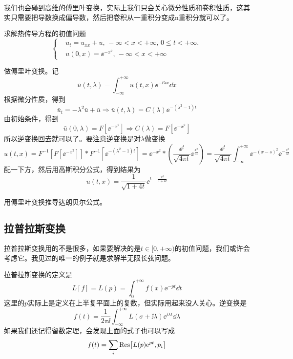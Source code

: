 我们也会碰到高维的傅里叶变换，实际上我们只会关心微分性质和卷积性质，这其实只需要把导数换成偏导数，然后把卷积从一重积分变成n重积分就可以了。
\begin{problembox}
    \begin{example}
        求解热传导方程的初值问题
        \begin{equation*}
            \left\{
                \begin{aligned}
                    &u_t = u_{xx} + u,\, -\infty < x < +\infty,\, 0 \leq t < +\infty,\\
                    &u(0, x) = \ee^{-x^2},\, -\infty < x < +\infty
                \end{aligned}
            \right.
        \end{equation*}
    \end{example}
    \begin{solution}
        做傅里叶变换。记
        \[\bar{u}(t, \lambda) = \int_{-\infty}^{+\infty} u(t, x) \ee^{- \ii \lambda x} \dd{x}\]
        根据微分性质，得到
        \[\bar{u}_t = -\lambda^2 \bar{u} + \bar{u} \Rightarrow \bar{u}(t, \lambda) = C(\lambda) \ee^{-\left(\lambda^2 - 1\right)t}\]
        由初始条件，得到
        \[\bar{u}(0, \lambda) = F[\ee^{-x^2}] \Rightarrow C(\lambda) = F[\ee^{-x^2}]\]
        所以逆变换回去就可以了。要注意逆变换是对$\lambda$做变换
        \[u(t, x) = F^{-1}\left[F[\ee^{-x^2}]\right] * F^{-1}[\ee^{-\left(\lambda^2 - 1\right)t}] = \ee^{-x^2} * \left(\frac{\ee^t}{\sqrt{4 \pi t}} \ee^{\frac{x^2}{4t}}\right) = \frac{\ee^{t}}{\sqrt{4 \pi t}}\int_{-\infty}^{+\infty} \ee^{-\left(x - s\right)^2} \ee^{-\frac{s^2}{4t}}\]
        配一下方，然后用高斯积分公式，得到结果为
        \[u(t, x) = \frac{1}{\sqrt{1 + 4t}} \ee^{t - \frac{x^2}{1 + 4t}}\]
    \end{solution}
\end{problembox}
\begin{problembox}
    \begin{exercise}
        用傅里叶变换推导达朗贝尔公式。
    \end{exercise}
\end{problembox}

\subsection{拉普拉斯变换}
拉普拉斯变换用的不是很多，如果要解决的是$t \in [0, +\infty)$的初值问题，我们或许会考虑它。我见过的唯一的例子就是求解半无限长弦问题。

拉普拉斯变换的定义是
\[L[f] = L(p) = \int_{0}^{+\infty} f(x) \ee^{-p t} \dd{t}\]
这里的$p$实际上是定义在上半复平面上的复数，但实际用起来没人关心。逆变换是
\[f(t) = \frac{1}{2 \pi \ii} \int_{-\infty}^{+\infty} L(\sigma + \ii \lambda) \ee^{\ii \lambda t} \dd{\lambda}\]
如果我们还记得留数定理，会发现上面的式子也可以写成
\[f(t) = \sum_i \Res[L(p) \ee^{p t}, p_i]\]

